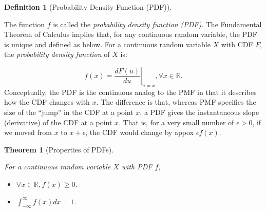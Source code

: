 \documentclass[
]{article}
\providecommand{\tightlist}{%
  \setlength{\itemsep}{0pt}\setlength{\parskip}{0pt}}
\newtheorem{theorem}{Theorem}[section]
\theoremstyle{definition}
\newtheorem{definition}{Definition}[section]
\theoremstyle{definition}
\theoremstyle{definition}
\theoremstyle{remark}
\begin{document}
\begin{definition}[Probability Density Function (PDF)]
\protect\hypertarget{def:unlabeled-div-32}{}\label{def:unlabeled-div-32}

The function \(f\) is called the \emph{probability density function (PDF)}. The Fundamental Theorem of Calculus implies that, for any continuous random variable, the PDF is unique and defined as below. For a continuous random variable \(X\) with CDF \(F\), the \emph{probability density function} of \(X\) is:

\[f(x) = \left.\frac{dF(u)}{du} \right\vert_{u=x}, \forall x \in \mathbb{R}.\]
Conceptually, the PDF is the continuous analog to the PMF in that it describes how the CDF changes with \(x\). The difference is that, whereas PMF specifies the size of the ``jump'' in the CDF at a point \(x\), a PDF gives the instantaneous slope (derivative) of the CDF at a point \(x\). That is, for a very small number of \(\epsilon > 0\), if we moved from \(x\) to \(x + \epsilon\), the CDF would change by appox \(\epsilon f(x)\).

\end{definition}

\begin{theorem}[Properties of PDFs]
\protect\hypertarget{thm:unlabeled-div-33}{}\label{thm:unlabeled-div-33}

For a continuous random variable \(X\) with PDF \(f\),

\begin{itemize}
\tightlist
\item
  \(\forall x \in \mathbb{R}, f(x) \geq 0\).
\item
  \(\int_{-\infty}^{\infty} f(x)dx = 1\).
\end{itemize}

\end{theorem}
\end{document}
